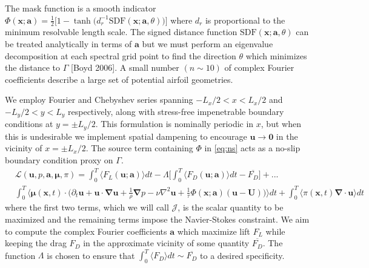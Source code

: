 \documentclass[11pt]{article}
\renewcommand{\vec}[1]{\boldsymbol{#1}}
\newcommand{\grad}{\vec{\nabla}}
\newcommand{\laplacian}{\nabla^2}
\begin{document}
\indent The mask function is a smooth indicator $\Phi(\vec{x}; \vec{a}) = \frac{1}{2}\big[ 1 - \tanh\big(d^{-1}_r\mathrm{SDF}(\vec{x}; \vec{a}, \theta)\big) \big]$ 
where $d_r$ is proportional to the minimum resolvable length scale.
The signed distance function $\text{SDF}(\vec{x}; \vec{a},\theta)$ can be treated analytically in terms of $\vec{a}$ but we must perform an eigenvalue decomposition at each spectral grid point to find the direction $\theta$ which minimizes the distance to $\Gamma$ [Boyd 2006].
A small number $(n \sim 10)$ of complex Fourier coefficients describe a large set of potential airfoil geometries. 


We employ Fourier and Chebyshev series spanning $-L_x/2<x<L_x/2$ and $-L_y/2<y<L_y$ respectively, along with stress-free impenetrable boundary conditions at $y = \pm L_y/2$.
This formulation is nominally periodic in $x$, but when this is undesirable we implement spatial dampening to encourage $\vec{u} \to \vec{0}$ in the vicinity of $x = \pm L_x/2$.
The source term containing $\Phi$ in \ref{eq:ns} acts as a no-slip boundary condition proxy on $\Gamma$.
\begin{align*}
  &\mathcal{L}(\vec{u},p,\vec{a}, \vec{\mu}, \pi) = \int_0^T \Big\langle F_L(\vec{u}; \vec{a}) \Big\rangle dt - \Lambda \Big[ \int_0^T \Big\langle F_D(\vec{u}; \vec{a}) \Big\rangle dt - \overline{F_D} \Big] + ... \\
  &\int_0^T \big\langle \vec{\mu}(\vec{x}, t) \cdot \big(\partial_t \vec{u} + \vec{u}\cdot\grad\vec{u} + \frac{1}{\rho}\grad p - \nu\laplacian\vec{u} + \frac{1}{\tau}\Phi(\vec{x}; \vec{a})(\vec{u} - \vec{U})\big) \big\rangle dt + \int_0^T \big\langle \pi(\vec{x},t)\grad\cdot\vec{u} \big\rangle dt 
\end{align*}
where the first two terms, which we will call $\mathcal{J}$, is the scalar quantity to be maximized and the remaining terms impose the Navier-Stokes constraint. 
We aim to compute the complex Fourier coefficients $\vec{a}$ which maximize lift $F_L$ while keeping the drag $F_D$ in the approximate vicinity of some quantity $\overline{F_D}$.
The function $\Lambda$ is chosen to ensure that $\int_0^T \langle F_D \rangle dt \sim \overline{F_D}$ to a desired specificity. \newline
\end{document}
